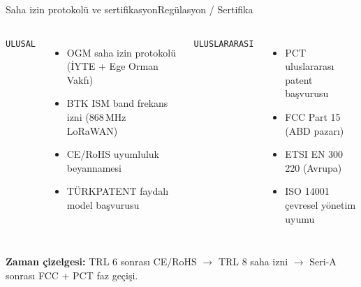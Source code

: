 \documentclass[aspectratio=169,11pt]{beamer}
\begin{document}
\begin{frame}{Saha izin protokol\"u ve sertifikasyon}{Reg\"ulasyon / Sertifika}
  \begin{columns}[T]
      {\footnotesize\color{ember}\texttt{ULUSAL}}\par
      {\scriptsize\color{sage}
        \begin{itemize}[leftmargin=*,itemsep=2pt]
          \item OGM saha izin protokol\"u (\.IYTE + Ege Orman Vakf{\i})
          \item BTK ISM band frekans izni (868\,MHz LoRaWAN)
          \item CE/RoHS uyumluluk beyannamesi
          \item T\"URKPATENT faydal{\i} model ba\c{s}vurusu
        \end{itemize}}
      {\footnotesize\color{ember}\texttt{ULUSLARARASI}}\par
      {\scriptsize\color{sage}
        \begin{itemize}[leftmargin=*,itemsep=2pt]
          \item PCT uluslararas{\i} patent ba\c{s}vurusu
          \item FCC Part 15 (ABD pazar{\i})
          \item ETSI EN 300 220 (Avrupa)
          \item ISO 14001 \c{c}evresel y\"onetim uyumu
        \end{itemize}}
  \end{columns}
  \vskip8pt
  {\footnotesize\color{sage}\textbf{Zaman \c{c}izelgesi:} TRL 6 sonras{\i} CE/RoHS $\to$ TRL 8 saha izni $\to$ Seri-A sonras{\i} FCC + PCT faz ge\c{c}i\c{s}i.}
\end{frame}
\end{document}
